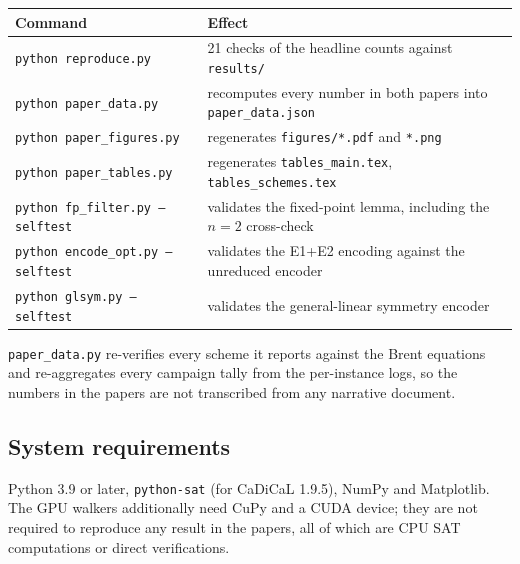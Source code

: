\documentclass[11pt]{article}
\begin{document}
\begin{center}
\small
\begin{tabular}{ll}
\toprule
Command & Effect \\
\midrule
\texttt{python reproduce.py} & 21 checks of the headline counts against \texttt{results/} \\
\texttt{python paper\_data.py} & recomputes every number in both papers into \texttt{paper\_data.json} \\
\texttt{python paper\_figures.py} & regenerates \texttt{figures/*.pdf} and \texttt{*.png} \\
\texttt{python paper\_tables.py} & regenerates \texttt{tables\_main.tex}, \texttt{tables\_schemes.tex} \\
\texttt{python fp\_filter.py --selftest} & validates the fixed-point lemma, including the $n=2$ cross-check \\
\texttt{python encode\_opt.py --selftest} & validates the E1+E2 encoding against the unreduced encoder \\
\texttt{python glsym.py --selftest} & validates the general-linear symmetry encoder \\
\bottomrule
\end{tabular}
\end{center}

\texttt{paper\_data.py} re-verifies every scheme it reports against the Brent equations and re-aggregates
every campaign tally from the per-instance logs, so the numbers in the papers are not transcribed from
any narrative document.

\subsection{System requirements}

Python 3.9 or later, \texttt{python-sat} (for CaDiCaL 1.9.5), NumPy and Matplotlib. The GPU walkers
additionally need CuPy and a CUDA device; they are not required to reproduce any result in the papers,
all of which are CPU SAT computations or direct verifications.
\end{document}
